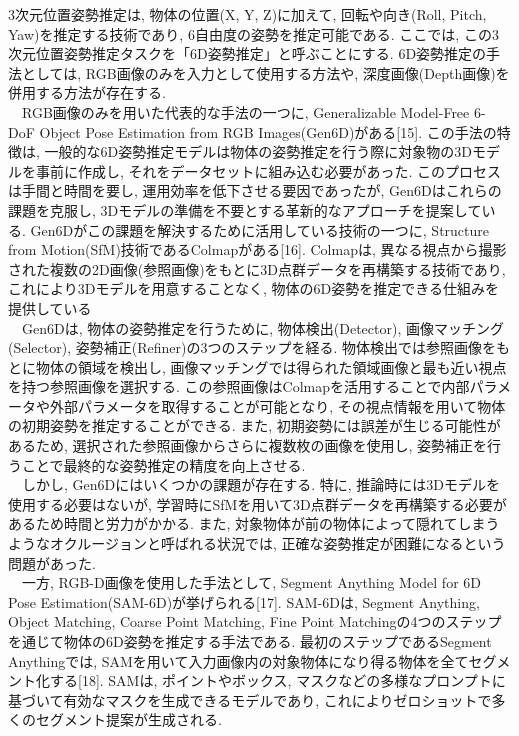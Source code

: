 3次元位置姿勢推定は, 物体の位置(X, Y, Z)に加えて, 回転や向き(Roll, Pitch, Yaw)を推定する技術であり, 6自由度の姿勢を推定可能である. 
ここでは, この3次元位置姿勢推定タスクを「6D姿勢推定」と呼ぶことにする. 
6D姿勢推定の手法としては, RGB画像のみを入力として使用する方法や, 深度画像(Depth画像)を併用する方法が存在する. \\
　RGB画像のみを用いた代表的な手法の一つに, Generalizable Model-Free 6-DoF Object Pose Estimation from RGB Images(Gen6D)がある[15]. 
この手法の特徴は, 一般的な6D姿勢推定モデルは物体の姿勢推定を行う際に対象物の3Dモデルを事前に作成し, それをデータセットに組み込む必要があった. 
このプロセスは手間と時間を要し, 運用効率を低下させる要因であったが, Gen6Dはこれらの課題を克服し, 3Dモデルの準備を不要とする革新的なアプローチを提案している. 
Gen6Dがこの課題を解決するために活用している技術の一つに, Structure from Motion(SfM)技術であるColmapがある[16]. 
Colmapは, 異なる視点から撮影された複数の2D画像(参照画像)をもとに3D点群データを再構築する技術であり, これにより3Dモデルを用意することなく, 物体の6D姿勢を推定できる仕組みを提供している\\
　Gen6Dは, 物体の姿勢推定を行うために, 物体検出(Detector), 画像マッチング(Selector), 姿勢補正(Refiner)の3つのステップを経る. 
物体検出では参照画像をもとに物体の領域を検出し, 画像マッチングでは得られた領域画像と最も近い視点を持つ参照画像を選択する. 
この参照画像はColmapを活用することで内部パラメータや外部パラメータを取得することが可能となり, その視点情報を用いて物体の初期姿勢を推定することができる. 
また, 初期姿勢には誤差が生じる可能性があるため, 選択された参照画像からさらに複数枚の画像を使用し, 姿勢補正を行うことで最終的な姿勢推定の精度を向上させる. \\
　しかし, Gen6Dにはいくつかの課題が存在する. 
特に, 推論時には3Dモデルを使用する必要はないが, 学習時にSfMを用いて3D点群データを再構築する必要があるため時間と労力がかかる. 
また, 対象物体が前の物体によって隠れてしまうようなオクルージョンと呼ばれる状況では, 正確な姿勢推定が困難になるという問題があった. \\
　一方, RGB-D画像を使用した手法として, Segment Anything Model for 6D Pose Estimation(SAM-6D)が挙げられる[17]. 
SAM-6Dは, Segment Anything, Object Matching, Coarse Point Matching, Fine Point Matchingの4つのステップを通じて物体の6D姿勢を推定する手法である. 
最初のステップであるSegment Anythingでは, SAMを用いて入力画像内の対象物体になり得る物体を全てセグメント化する[18]. 
SAMは, ポイントやボックス, マスクなどの多様なプロンプトに基づいて有効なマスクを生成できるモデルであり, これによりゼロショットで多くのセグメント提案が生成される. 
